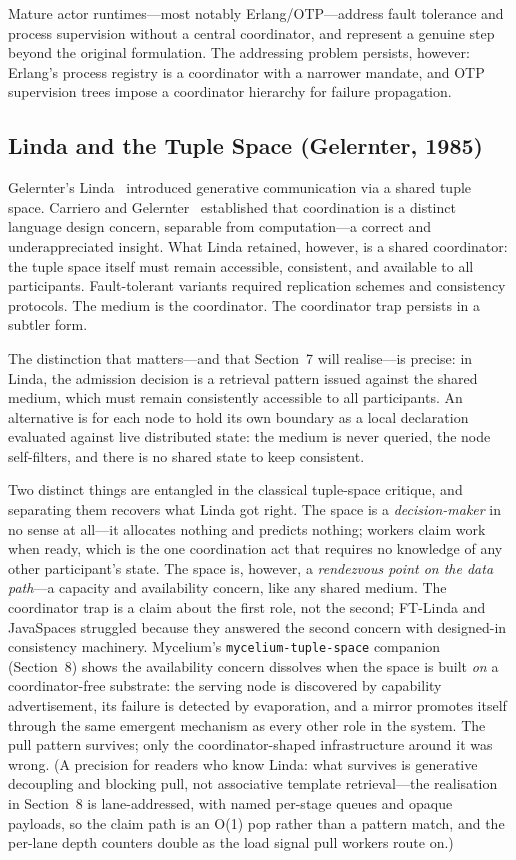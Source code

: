 \documentclass[11pt]{article}
\begin{document}
Mature actor runtimes---most notably Erlang/OTP---address fault tolerance and
process supervision without a central coordinator, and represent a genuine step
beyond the original formulation. The addressing problem persists, however:
Erlang's process registry is a coordinator with a narrower mandate, and OTP
supervision trees impose a coordinator hierarchy for failure propagation.

\subsection{Linda and the Tuple Space (Gelernter, 1985)}

Gelernter's Linda~\cite{linda} introduced generative communication via a shared
tuple space. Carriero and Gelernter~\cite{linda-coord} established that
coordination is a distinct language design concern, separable from
computation---a correct and underappreciated insight. What Linda retained,
however, is a shared coordinator: the tuple space itself must remain accessible,
consistent, and available to all participants. Fault-tolerant variants required
replication schemes and consistency protocols. The medium is the coordinator. The
coordinator trap persists in a subtler form.

The distinction that matters---and that Section~7 will realise---is precise: in
Linda, the admission decision is a retrieval pattern issued against the shared
medium, which must remain consistently accessible to all participants. An
alternative is for each node to hold its own boundary as a local declaration
evaluated against live distributed state: the medium is never queried, the node
self-filters, and there is no shared state to keep consistent.

Two distinct things are entangled in the classical tuple-space critique, and
separating them recovers what Linda got right. The space is a
\emph{decision-maker} in no sense at all---it allocates nothing and predicts
nothing; workers claim work when ready, which is the one coordination act that
requires no knowledge of any other participant's state. The space is, however, a
\emph{rendezvous point on the data path}---a capacity and availability concern,
like any shared medium. The coordinator trap is a claim about the first role, not
the second; FT-Linda and JavaSpaces struggled because they answered the second
concern with designed-in consistency machinery. Mycelium's
\texttt{mycelium-tuple-space} companion (Section~8) shows the availability
concern dissolves when the space is built \emph{on} a coordinator-free
substrate: the serving node is discovered by capability advertisement, its
failure is detected by evaporation, and a mirror promotes itself through the same
emergent mechanism as every other role in the system. The pull pattern survives;
only the coordinator-shaped infrastructure around it was wrong. (A precision for
readers who know Linda: what survives is generative decoupling and blocking pull,
not associative template retrieval---the realisation in Section~8 is
lane-addressed, with named per-stage queues and opaque payloads, so the claim
path is an O(1) pop rather than a pattern match, and the per-lane depth counters
double as the load signal pull workers route on.)
\end{document}
